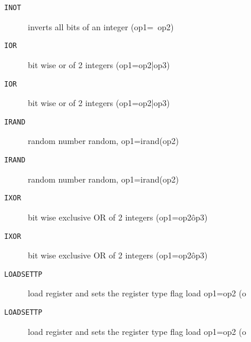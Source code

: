 \begin{description}
\item[\texttt{INOT}]  inverts all bits of an integer (op1=~op2)\\

\end{description}
\begin{description}
\item[\texttt{IOR}]  bit wise or of 2 integers (op1=op2|op3)\\

\end{description}
\begin{description}
\item[\texttt{IOR}]  bit wise or of 2 integers (op1=op2|op3)\\

\end{description}
\begin{description}
\item[\texttt{IRAND}]  random number random, op1=irand(op2)\\

\end{description}
\begin{description}
\item[\texttt{IRAND}]  random number random, op1=irand(op2)\\

\end{description}
\begin{description}
\item[\texttt{IXOR}]  bit wise exclusive OR of 2 integers (op1=op2\^op3)\\

\end{description}
\begin{description}
\item[\texttt{IXOR}]  bit wise exclusive OR of 2 integers (op1=op2\^op3)\\

\end{description}
\begin{description}
\item[\texttt{LOADSETTP}]  load register and sets the register type flag load op1=op2 (o\\

\end{description}
\begin{description}
\item[\texttt{LOADSETTP}]  load register and sets the register type flag load op1=op2 (o\\

\end{description}
